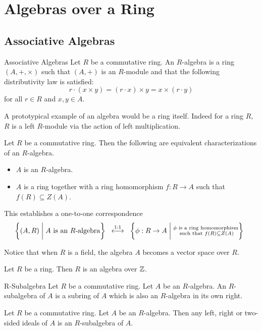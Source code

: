 \documentclass[a4paper]{article}
\begin{document}
\section{Algebras over a Ring}
\subsection{Associative Algebras}
\begin{defn}{Associative Algebras}{} Let $R$ be a commutative ring. An $R$-algebra is a ring $(A,+,\times)$ such that $(A,+)$ is an $R$-module and that the following distributivity law is satisfied: $$r\cdot(x\times y)=(r\cdot x)\times y=x\times(r\cdot y)$$ for all $r\in R$ and $x,y\in A$. 
\end{defn}

A prototypical example of an algebra would be a ring itself. Indeed for a ring $R$, $R$ is a left $R$-module via the action of left multiplication. 

\begin{prp}{}{} Let $R$ be a commutative ring. Then the following are equivalent characterizations of an $R$-algebra. 
\begin{itemize}
\item $A$ is an $R$-algebra. 
\item $A$ is a ring together with a ring homomorphism $f:R\to A$ such that $f(R)\subseteq Z(A)$. 
\end{itemize}
\end{prp}

This establishes a one-to-one correspondence $$\left\{(A,R)\;\bigg{|}\;A\text{ is an }R\text{-algebra}\right\}\;\;\overset{1:1}{\longleftrightarrow}\;\;\left\{\phi:R\to A\;\bigg{|}\;\substack{\phi\text{ is a ring homomorphism}\\\text{ such that }f(R)\subseteq Z(A)}\right\}\;\;$$

Notice that when $R$ is a field, the algebra $A$ becomes a vector space over $R$. 

\begin{lmm}{}{} Let $R$ be a ring. Then $R$ is an algebra over $\mathbb{Z}$. 
\end{lmm}

\begin{defn}{R-Subalgebra}{} Let $R$ be a commutative ring. Let $A$ be an $R$-algebra. An $R$-subalgebra of $A$ is a subring of $A$ which is also an $R$-algebra in its own right. 
\end{defn}

\begin{prp}{}{} Let $R$ be a commutative ring. Let $A$ be an $R$-algebra. Then any left, right or two-sided ideals of $A$ is an $R$-subalgebra of $A$. 
\end{prp}
\end{document}
